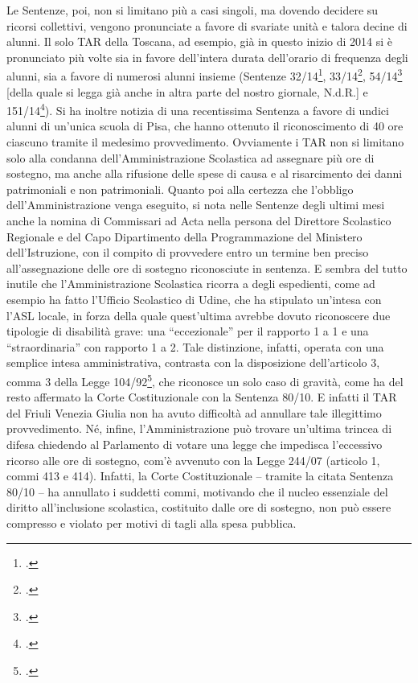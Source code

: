 Le Sentenze, poi, non si limitano più a casi singoli, ma dovendo decidere su ricorsi collettivi, vengono pronunciate a favore di svariate unità e talora decine di alunni. Il solo TAR della Toscana, ad esempio, già in questo inizio di 2014 si è pronunciato più volte sia in favore dell'intera durata dell'orario di frequenza degli alunni, sia a favore di numerosi alunni insieme (Sentenze 32/14\footcite{TARToscana2014a}, 33/14\footcite{TARToscana2014b}, 54/14\footcite{TARToscana2014c} [della quale si legga già anche in altra parte del nostro giornale, N.d.R.] e 151/14\footcite{TARToscana2014d}). Si ha inoltre notizia di una recentissima Sentenza a favore di undici alunni di un'unica scuola di Pisa, che hanno ottenuto il riconoscimento di 40 ore ciascuno tramite il medesimo provvedimento.
Ovviamente i TAR non si limitano solo alla condanna dell'Amministrazione Scolastica ad assegnare più ore di sostegno, ma anche alla rifusione delle spese di causa e al risarcimento dei danni patrimoniali e non patrimoniali. Quanto poi alla certezza che l'obbligo dell'Amministrazione venga eseguito, si nota nelle Sentenze degli ultimi mesi anche la nomina di Commissari ad Acta nella persona del Direttore Scolastico Regionale e del Capo Dipartimento della Programmazione del Ministero dell'Istruzione, con il compito di provvedere entro un termine ben preciso all'assegnazione delle ore di sostegno riconosciute in sentenza.
E sembra del tutto inutile che l'Amministrazione Scolastica ricorra a degli espedienti, come ad esempio ha fatto l'Ufficio Scolastico di Udine, che ha stipulato un'intesa con l'ASL locale, in forza della quale quest'ultima avrebbe dovuto riconoscere due tipologie di disabilità grave: una “eccezionale” per il rapporto 1 a 1 e una “straordinaria” con rapporto 1 a 2. Tale distinzione, infatti, operata con una semplice intesa amministrativa, contrasta con la disposizione dell'articolo 3, comma 3 della Legge 104/92\footcite{Legge_104_92}, che riconosce un solo caso di gravità, come ha del resto affermato la Corte Costituzionale con la Sentenza 80/10. E infatti il TAR del Friuli Venezia Giulia non ha avuto difficoltà ad annullare tale illegittimo provvedimento.
Né, infine, l'Amministrazione può trovare un'ultima trincea di difesa chiedendo al Parlamento di votare una legge che impedisca l'eccessivo ricorso alle ore di sostegno, com'è avvenuto con la Legge 244/07 (articolo 1, commi 413 e 414). Infatti, la Corte Costituzionale – tramite la citata Sentenza 80/10 – ha annullato i suddetti commi, motivando che il nucleo essenziale del diritto all'inclusione scolastica, costituito dalle ore di sostegno, non può essere compresso e violato per motivi di tagli alla spesa pubblica.

